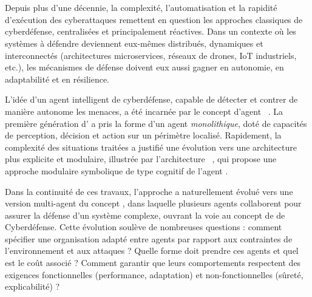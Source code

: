 \cleardoublepage{}
\cleardoublepage
{}

\

\vspace{1em}

\bigskip

\\

Depuis plus d'une décennie, la complexité, l'automatisation et la rapidité d'exécution des cyberattaques remettent en question les approches classiques de cyberdéfense, centralisées et principalement réactives. Dans un contexte où les systèmes à défendre deviennent eux-mêmes distribués, dynamiques et interconnectés (architectures microservices, réseaux de drones, IoT industriels, etc.), les mécanismes de défense doivent eux aussi gagner en autonomie, en adaptabilité et en résilience.

L'idée d'un agent intelligent de cyberdéfense, capable de détecter et contrer de manière autonome les menaces, a été incarnée par le concept d'agent ~\cite{Kott2023}. La première génération d' a pris la forme d'un agent \textit{monolithique}, doté de capacités de perception, décision et action sur un périmètre localisé. Rapidement, la complexité des situations traitées a justifié une évolution vers une architecture plus explicite et modulaire, illustrée par l'architecture ~\cite{Kott2023}, qui propose une approche modulaire symbolique de type cognitif de l'agent .

Dans la continuité de ces travaux, l'approche a naturellement évolué vers une version multi-agent du concept , dans laquelle plusieurs agents collaborent pour assurer la défense d'un système complexe, ouvrant la voie au concept de  de Cyberdéfense. Cette évolution soulève de nombreuses questions : comment spécifier une organisation adapté entre agents par rapport aux contraintes de l'environnement et aux attaques ? Quelle forme doit prendre ces agents et quel est le coût associé ? Comment garantir que leurs comportements respectent des exigences fonctionnelles (performance, adaptation) et non-fonctionnelles (sûreté, explicabilité) ?

\

\bigskip

